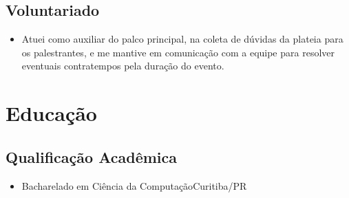 \documentclass[a4paper, 12pt]{moderncv}
\begin{document}
\vspace{4pt}
\subsection{\small{Voluntariado}}
\begin{itemize}
    \item{
            {\vspace{3pt}Atuei como auxiliar do palco principal, na coleta de dúvidas
                da plateia para os palestrantes, e me mantive em comunicação com a equipe
            para resolver eventuais contratempos pela duração do evento.}}
        \vspace{4pt}
\end{itemize}
\vspace{4pt}

\section{Educação}
\vspace{1pt}
\subsection{\small{Qualificação Acadêmica}}
\vspace{2pt}
\begin{itemize}
    \item{
        {Bacharelado em Ciência da Computação}{Curitiba/PR}{}{}}
\end{itemize}
\vspace{4pt}
\end{document}
